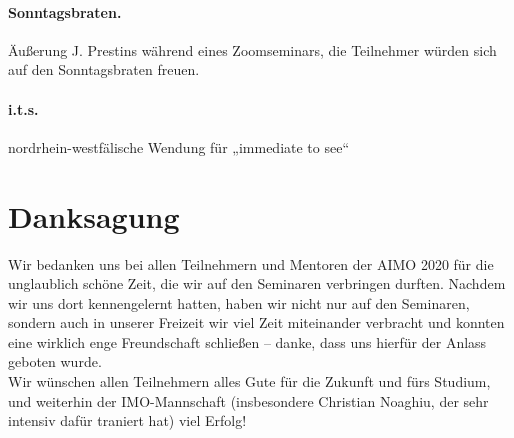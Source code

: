 \documentclass[oneside]{memoir}
\begin{document}
\paragraph{Sonntagsbraten.} Äußerung J. Prestins während eines Zoomseminars, die Teilnehmer würden sich auf den Sonntagsbraten freuen.
\paragraph{i.t.s.} nordrhein-westfälische Wendung für „immediate to see“
\newpage
\section*{Danksagung} 
Wir bedanken uns bei allen Teilnehmern und Mentoren der AIMO 2020 für die unglaublich schöne Zeit, die wir auf den Seminaren verbringen durften. Nachdem wir uns dort kennengelernt hatten, haben wir nicht nur auf den Seminaren, sondern auch in unserer Freizeit wir viel Zeit miteinander verbracht und konnten eine wirklich enge Freundschaft schließen -- danke, dass uns hierfür der Anlass geboten wurde. \\
Wir wünschen allen Teilnehmern alles Gute für die Zukunft und fürs Studium, und weiterhin der IMO-Mannschaft (insbesondere Christian Noaghiu, der sehr intensiv dafür traniert hat) viel Erfolg!
\end{document}
